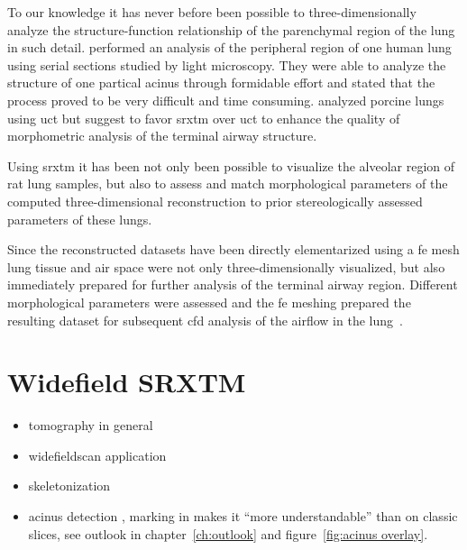 To our knowledge it has never before been possible to three-dimensionally analyze the structure-function relationship of the parenchymal region of the lung in such detail. \citet{Berend1991} performed an analysis of the peripheral region of one human lung using serial sections studied by light microscopy. They were able to analyze the structure of one partical acinus through formidable effort and stated that the process proved to be very difficult and time consuming. \citet{Litzlbauer2006} analyzed porcine lungs using \ac{uct} but suggest to favor \ac{srxtm} over \ac{uct} to enhance the quality of morphometric analysis of the terminal airway structure.

Using \ac{srxtm} it has been not only been possible to visualize the alveolar region of rat lung samples, but also to assess and match morphological parameters of the computed three-dimensional reconstruction to prior stereologically assessed parameters of these lungs.

Since the reconstructed datasets have been directly elementarized using a \ac{fe} mesh lung tissue and air space were not only three-dimensionally visualized, but also immediately prepared for further analysis of the terminal airway region. Different morphological parameters were assessed and the \ac{fe} meshing prepared the resulting dataset for subsequent \ac{cfd} analysis of the airflow in the lung~.

\section{Widefield SRXTM}
\begin{itemize}
	\item tomography in general
	\item widefieldscan application
	\item skeletonization
	\item acinus detection \threed, marking in \twod makes it ``more understandable'' than on classic slices, see outlook in chapter~\ref{ch:outlook} and figure~\ref{fig:acinus overlay}.
\end{itemize}